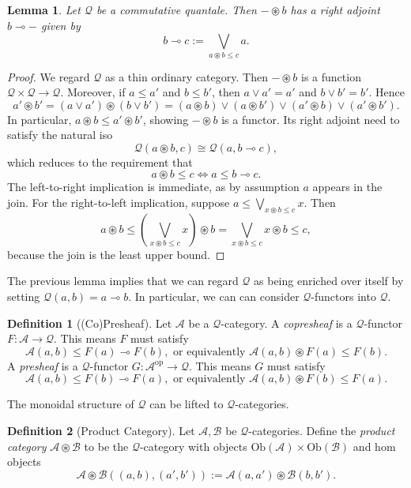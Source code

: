 \documentclass[12pt]{article}
\theoremstyle{definition}
\newtheorem{definition}{Definition}[section]
\theoremstyle{plain}
\newtheorem{lemma}{Lemma}[section]
\theoremstyle{plain}
\theoremstyle{plain}
\theoremstyle{plain}
\theoremstyle{remark}
\theoremstyle{remark}
\newcommand{\mc}[1]{\mathcal{#1}}
\begin{document}
\begin{lemma} \label{closed quantale}
	Let $\mc{Q}$ be a commutative quantale. Then $- \circledast b$ has a right adjoint $b \multimap -$ given by $$b \multimap c := \bigvee_{a \circledast b \leq c} a.$$
\end{lemma}
\begin{proof}
	We regard $\mc{Q}$ as a thin ordinary category. Then $- \circledast b$ is a function $\mc{Q} \times \mc{Q} \rightarrow \mc{Q}$. Moreover, if $a \leq a'$ and $b  \leq b'$, then $a \vee a' = a'$ and $b \vee b' = b'$. Hence 
	$$a' \circledast b' = (a \vee a') \circledast (b \vee b') = (a \circledast b) \vee (a \circledast b') \vee (a' \circledast b) \vee (a' \circledast b').$$
	In particular, $a \circledast b \leq a' \circledast b'$, showing $- \circledast b$ is a functor. Its right adjoint need to satisfy the natural iso
	$$\mc{Q}(a \circledast b, c) \cong \mc{Q}(a, b \multimap c),$$ which reduces to the requirement that 
	$$a \circledast b \leq c \Leftrightarrow a \leq b \multimap c.$$
	The left-to-right implication is immediate, as by assumption $a$ appears in the join. For the right-to-left implication, suppose $a \leq \bigvee_{x \circledast b \leq c} x$. Then $$a \circledast b \leq  \left( \bigvee_{x \circledast b \leq c} x \right) \circledast b = \bigvee_{x \circledast b \leq c} x \circledast b \leq c,$$ because the join is the least upper bound. 
\end{proof}

The previous lemma implies that we can regard $\mc{Q}$ as being enriched over itself by setting $\mc{Q}(a,b) = a \multimap b$. In particular, we can can consider $\mc{Q}$-functors into $\mc{Q}$.

\begin{definition}[(Co)Presheaf]
	Let $\mc{A}$ be a $\mc{Q}$-category. A \emph{copresheaf} is a $\mc{Q}$-functor $F: \mc{A} \rightarrow \mc{Q}$. This means $F$ must satisfy
	$$
	\mc{A}(a,b) \leq F(a) \multimap F(b), \text{   or equivalently   }  \mc{A}(a,b) \circledast F(a) \leq F(b).
	$$
	A \emph{presheaf} is a $\mc{Q}$-functor $G: \mc{A}^\text{op} \rightarrow \mc{Q}$. This means $G$ must satisfy
	$$
	\mc{A}(a,b) \leq F(b) \multimap F(a), \text{   or equivalently   } \mc{A}(a,b) \circledast F(b)  \leq F(a).
	$$

\end{definition}

The monoidal structure of $\mc{Q}$ can be lifted to $\mc{Q}$-categories.
\begin{definition}[Product Category]
	Let $\mc{A}, \mc{B}$ be $\mc{Q}$-categories. Define the \emph{product category} $\mc{A} \circledast \mc{B}$ to be the $\mc{Q}$-category with objects $\text{Ob}(\mc{A}) \times \text{Ob}(\mc{B})$ and hom objects $$\mc{A} \circledast \mc{B}((a,b),(a',b')) := \mc{A}(a,a') \circledast \mc{B}(b,b').$$
\end{definition}
\end{document}
